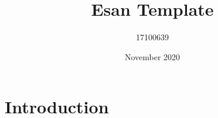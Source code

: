 \documentclass{article}
\title{Esan Template}
\author{17100639 }
\date{November 2020}
\begin{document}
\maketitle

\section{Introduction}
\end{document}
